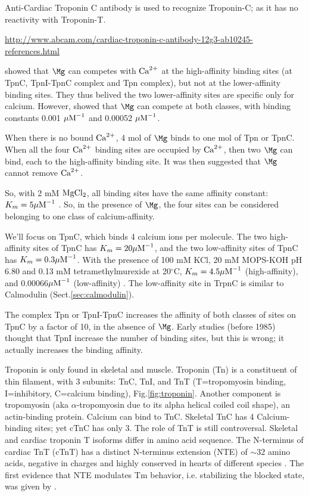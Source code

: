 \begin{framed}
Anti-Cardiac Troponin C antibody is used to recognize Troponin-C; as it has no
reactivity with Troponin-T.

\url{http://www.abcam.com/cardiac-troponin-c-antibody-12g3-ab10245-references.html}
\end{framed}


\citep{Potter1975}  showed that $\Mg$ can competes with ${\text{Ca}^{2+}}$ at the
high-affinity binding sites (at TpnC, TpnI-TpnC complex and Tpn complex), but
not at the lower-affinity binding sites.
They thus belived the two lower-affinity sites are specific only for calcium.
However, \citep{Ogawa1984} showed that $\Mg$ can compete at both classes, with
binding constants 0.001 ${\mu\text{M}}^{-1}$ and 0.00052 ${\mu\text{M}}^{-1}$.

When there is no bound ${\text{Ca}^{2+}}$, 4 mol of $\Mg$ binds to one mol of Tpn or TpnC.
When all the four ${\text{Ca}^{2+}}$ binding sites are occupied by ${\text{Ca}^{2+}}$, then two $\Mg$ can
bind, each to the high-affinity binding site. It was then suggested that $\Mg$
cannot remove ${\text{Ca}^{2+}}$.

So, with 2 mM $\ce{MgCl2}$, all binding sites have the same affinity constant:
$K_m=5 {\mu\text{M}}^{-1}$ \citep{Potter1975}. So, in the presence of $\Mg$, the four
sites can be considered belonging to one class of calcium-affinity.

We'll focus on TpnC, which binds 4 calcium ions per molecule. The two
high-affinity sites of TpnC has $K_m=20 {\mu\text{M}}^{-1}$, and the two low-affinity
sites of TpnC has $K_m=0.3{\mu\text{M}}^{-1}$. With the presence of 100 mM KCl, 20 mM
MOPS-KOH pH 6.80 and 0.13 mM tetramethylmurexide at 20$^\circ$C, $K_m=4.5
{\mu\text{M}}^{-1}$ (high-affinity), and 0.00066${\mu\text{M}}^{-1}$ (low-affinity)
\citep{Ogawa1984}. The low-affinity site in TrpnC is similar to Calmodulin
(Sect.\ref{sec:calmodulin}).

\begin{framed}
The complex Tpn or TpnI-TpnC increases the affinity of both classes of sites on
TpnC by a factor of 10, in the absence of $\Mg$. Early studies (before
1985) thought that TpnI increase the number of binding sites, but this is wrong;
it actually increases the binding affinity.

\end{framed}

Troponin is only found in skeletal and muscle. Troponin (Tn) is a constituent of
thin filament, with 3 subunits: TnC, TnI, and TnT (T=tropomyosin binding,
I=inhibitory, C=calcium binding), Fig.\ref{fig:troponin}. Another component is
tropomyosin (aka $\alpha$-tropomyosin due to its alpha helical coiled coil
shape), an actin-binding protein. Calcium can bind to TnC.
Skeletal TnC has 4 Calcium-binding sites; yet cTnC has only 3. The role of TnT
is still controversal. Skeletal and cardiac troponin T isoforms differ in amino
acid sequence. The N-terminus of cardiac TnT (cTnT) has a distinct N-terminus
extension (NTE) of $\sim 32$ amino acids, negative in charges and highly
conserved in hearts of different species \citep{geeves2012}. The first evidence
that NTE modulates Tm behavior, i.e. stabilizing the blocked state, was given by
\citep{gollapudi2012}.

